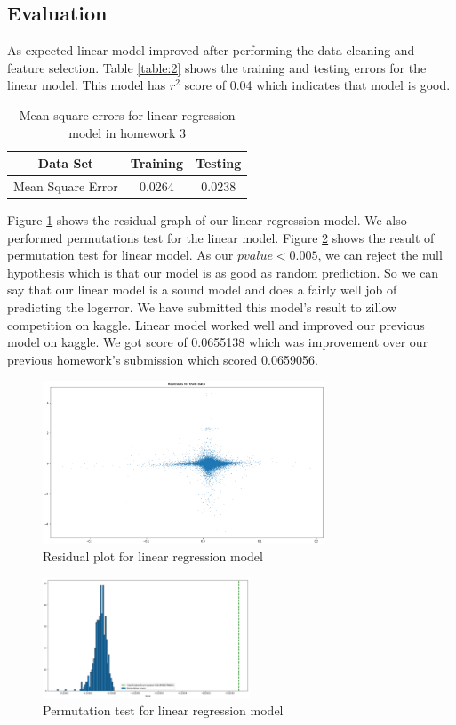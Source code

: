 \documentclass[a4paper, 11pt]{article}
\begin{document}
\subsection{Evaluation}
As expected linear model improved after performing the data cleaning and feature selection.  Table \ref{table:2} shows the training and testing errors for the linear model. This model has $r^2$ score of 0.04 which indicates that model is good. 
\begin{table}[h!]
\centering
\begin{tabular}{||c c c ||} 
 \hline
 Data Set & Training &  Testing \\ [0.5ex] 
 \hline\hline
 Mean Square Error & 0.0264  & 0.0238 \\ [1ex] 
 \hline
\end{tabular}
\caption{Mean square errors for linear regression model in homework 3}
\label{table:1}
\end{table}
Figure \ref{fig:res1} shows the residual graph of our linear regression model. We also performed permutations test for the linear model. Figure \ref{fig:res2} shows the result of permutation test for linear model. As our $pvalue<0.005$, we can reject the null hypothesis which is that our model is as good as random prediction. So we can say that our linear model is a sound model and does a fairly well job of predicting the logerror. We have submitted this model's result to zillow competition on kaggle.
Linear model worked well and improved our previous model on kaggle. We got score of 0.0655138 which was improvement over our previous homework's submission which scored 0.0659056.
\begin{figure}[h]
    \centering
    \includegraphics[width=0.75\textwidth]{residual}
    \caption{Residual plot for linear regression model }
    \label{fig:res1}
\end{figure}
\begin{figure}[h]
    \centering
    \includegraphics[width=0.55\textwidth]{ptest_linear}
    \caption{Permutation test for linear regression model }
    \label{fig:res2}
\end{figure}
\end{document}
